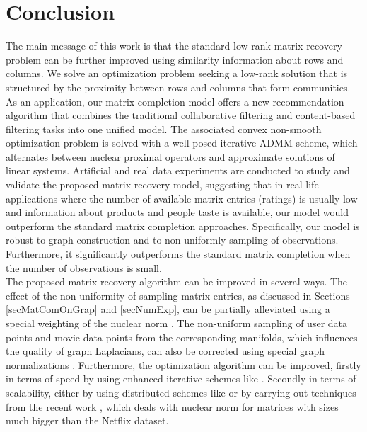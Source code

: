 \documentclass{article}
\newcommand{\denserrlistbib}{
    \itemsep -1pt\topsep-6pt\partopsep-6pt
}
\begin{document}
\vspace{-0.1cm}
\section{Conclusion}
\label{secCon}
\vspace{-0.15cm}
The main message of this work is that the standard low-rank matrix recovery problem can be further improved using similarity information about rows and columns. We solve an optimization problem seeking a low-rank solution that is structured by the proximity between rows and columns that form communities. As an application, our matrix completion model offers a new recommendation algorithm that combines the traditional collaborative filtering and content-based filtering tasks into one unified model. The associated convex non-smooth optimization problem is solved with a well-posed iterative ADMM scheme, which alternates between nuclear proximal operators and approximate solutions of linear systems. Artificial and real data experiments are conducted to study and validate the proposed matrix recovery model, suggesting that in real-life applications where the number of available matrix entries (ratings) is usually low and information about products and people taste is available, our model would outperform the standard matrix completion approaches. 
Specifically, our model is robust to graph construction and to non-uniformly sampling of observations. Furthermore, it significantly outperforms the standard matrix completion when the number of observations is small. \\
The proposed matrix recovery algorithm can be improved in several ways. The effect of the non-uniformity of sampling matrix entries, as discussed in Sections \ref{secMatComOnGrap} and \ref{secNumExp}, can be partially alleviated using a special weighting of the nuclear norm \cite{salakhutdinov2010collaborative}. The non-uniform sampling of user data points and movie data points from the corresponding manifolds, which influences the quality of graph Laplacians, can also be corrected using special graph normalizations \cite{art:CoifmanLafon06DifMap}. Furthermore, the optimization algorithm can be improved, firstly in terms of speed by using enhanced iterative schemes like \cite{nesterov2013first}. Secondly in terms of scalability, either by using distributed schemes like \cite{mardani2012distributed} or by carrying out techniques from the recent work \cite{hsieh2014nuclear}, which deals with nuclear norm for matrices with sizes much bigger than the Netflix dataset. 











\denserrlistbib


\end{document}
